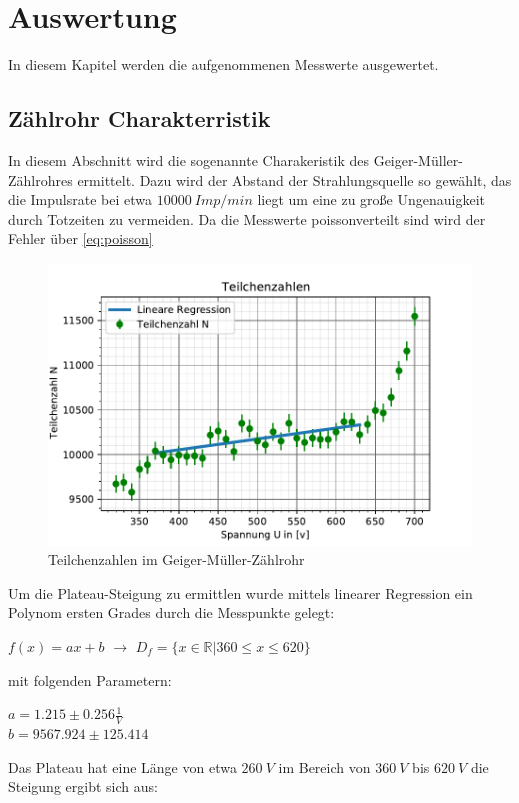 \section{Auswertung}
\label{sec:auswertung}
In diesem Kapitel werden die aufgenommenen Messwerte ausgewertet.
\subsection{Zählrohr Charakterristik}
\label{sec:characteristik}
In diesem Abschnitt wird die sogenannte Charakeristik des Geiger-Müller-Zählrohres ermittelt. Dazu wird der
Abstand der Strahlungsquelle so gewählt, das die Impulsrate bei etwa $\SI{10000}{Imp/min}$ liegt um eine zu große 
Ungenauigkeit durch Totzeiten zu vermeiden. Da die Messwerte poissonverteilt sind wird der Fehler über \autoref{eq:poisson}
\begin{figure}
    \centering
    \includegraphics{kennlinie.pdf}
    \caption{Teilchenzahlen im Geiger-Müller-Zählrohr}
    \label{fig:teilchenzahl}
  \end{figure}
Um die Plateau-Steigung zu ermittlen wurde mittels linearer Regression ein Polynom ersten Grades durch die 
Messpunkte gelegt:
\begin{center}
  $f(x)=ax+b$ $\rightarrow$ $D_f=\{x\in\mathbb{R} \vert 360\le x\le620\}$    
\end{center}
mit folgenden Parametern:
\begin{center}
  $a=1.215\pm0.256 \frac{1}{V} $\\
  $b=9567.924\pm125.414 $
\end{center}
Das Plateau hat eine Länge von etwa $\SI{260}{V}$ im Bereich von $\SI{360}{V}$ bis $\SI{620}{V}$ die Steigung 
ergibt sich aus:
